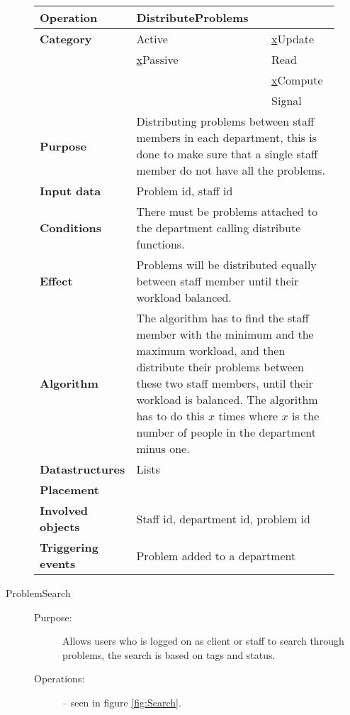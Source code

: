 \begin{figure}
\begin{tabular}{p{3.5cm} p{4cm} p{4cm}}
\hline
\textbf{Operation}&DistributeProblems\\
\hline
\textbf{Category}&\underline{ }Active&\underline{x}Update\\
&\underline{x}Passive&\underline{ }Read\\
&&\underline{x}Compute\\
&&\underline{ }Signal\\
\textbf{Purpose}&\multicolumn{2}{p{8cm}}{Distributing problems between staff members in each department, this is done to make sure that a single staff member do not have all the problems.}\\
\textbf{Input data}&\multicolumn{2}{p{8cm}}{Problem id, staff id}\\
\textbf{Conditions}&\multicolumn{2}{p{8cm}}{There must be problems attached to the department calling distribute functions.}\\
\textbf{Effect}&\multicolumn{2}{p{8cm}}{Problems will be distributed equally between staff member until their workload balanced.}\\
\textbf{Algorithm}&\multicolumn{2}{p{8cm}}{The algorithm has to find the staff member with the minimum and the maximum workload, and then distribute their problems between these two staff members, until their workload is balanced. The algorithm has to do this $x$ times where $x$ is the number of people in the department minus one.}\\
\textbf{Datastructures}&\multicolumn{2}{p{8cm}}{Lists}\\
\textbf{Placement}&\multicolumn{2}{p{8cm}}{}\\
\textbf{Involved objects}&\multicolumn{2}{p{8cm}}{Staff id, department id, problem id}\\
\textbf{Triggering events}&\multicolumn{2}{p{8cm}}{Problem added to a department}\\
\hline
\end{tabular}
\label{fig:DistributeProblems}
\end{figure}

\begin{description}
\item[ProblemSearch]\hfill
\begin{description}
\item[Purpose:]Allows users who is logged on as client or staff to search through problems, the search is based on tags and status.
\item[Operations:] -- seen in figure \ref{fig:Search}.
\end{description}
\end{description}

